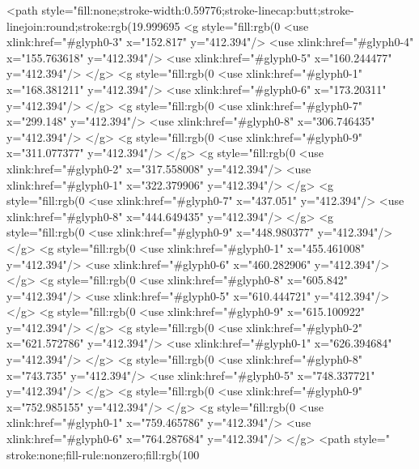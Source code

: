 <path style="fill:none;stroke-width:0.59776;stroke-linecap:butt;stroke-linejoin:round;stroke:rgb(19.999695%
<g style="fill:rgb(0%
  <use xlink:href="#glyph0-3" x="152.817" y="412.394"/>
  <use xlink:href="#glyph0-4" x="155.763618" y="412.394"/>
  <use xlink:href="#glyph0-5" x="160.244477" y="412.394"/>
</g>
<g style="fill:rgb(0%
  <use xlink:href="#glyph0-1" x="168.381211" y="412.394"/>
  <use xlink:href="#glyph0-6" x="173.20311" y="412.394"/>
</g>
<g style="fill:rgb(0%
  <use xlink:href="#glyph0-7" x="299.148" y="412.394"/>
  <use xlink:href="#glyph0-8" x="306.746435" y="412.394"/>
</g>
<g style="fill:rgb(0%
  <use xlink:href="#glyph0-9" x="311.077377" y="412.394"/>
</g>
<g style="fill:rgb(0%
  <use xlink:href="#glyph0-2" x="317.558008" y="412.394"/>
  <use xlink:href="#glyph0-1" x="322.379906" y="412.394"/>
</g>
<g style="fill:rgb(0%
  <use xlink:href="#glyph0-7" x="437.051" y="412.394"/>
  <use xlink:href="#glyph0-8" x="444.649435" y="412.394"/>
</g>
<g style="fill:rgb(0%
  <use xlink:href="#glyph0-9" x="448.980377" y="412.394"/>
</g>
<g style="fill:rgb(0%
  <use xlink:href="#glyph0-1" x="455.461008" y="412.394"/>
  <use xlink:href="#glyph0-6" x="460.282906" y="412.394"/>
</g>
<g style="fill:rgb(0%
  <use xlink:href="#glyph0-8" x="605.842" y="412.394"/>
  <use xlink:href="#glyph0-5" x="610.444721" y="412.394"/>
</g>
<g style="fill:rgb(0%
  <use xlink:href="#glyph0-9" x="615.100922" y="412.394"/>
</g>
<g style="fill:rgb(0%
  <use xlink:href="#glyph0-2" x="621.572786" y="412.394"/>
  <use xlink:href="#glyph0-1" x="626.394684" y="412.394"/>
</g>
<g style="fill:rgb(0%
  <use xlink:href="#glyph0-8" x="743.735" y="412.394"/>
  <use xlink:href="#glyph0-5" x="748.337721" y="412.394"/>
</g>
<g style="fill:rgb(0%
  <use xlink:href="#glyph0-9" x="752.985155" y="412.394"/>
</g>
<g style="fill:rgb(0%
  <use xlink:href="#glyph0-1" x="759.465786" y="412.394"/>
  <use xlink:href="#glyph0-6" x="764.287684" y="412.394"/>
</g>
<path style=" stroke:none;fill-rule:nonzero;fill:rgb(100%
